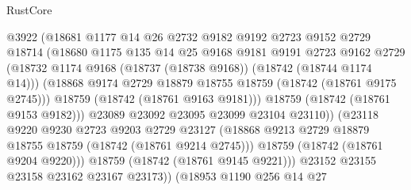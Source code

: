 \begin{lexlean}{RustCore}
\begin{coremodule}
                            @3922
                            (@18681
                              @1177
                              @14
                              @26
                              @2732
                              @9182
                              @9192
                              @2723
                              @9152
                              @2729
                              @18714
                              (@18680
                                @1175
                                @135
                                @14
                                @25
                                @9168
                                @9181
                                @9191
                                @2723
                                @9162
                                @2729
                                (@18732
                                  @1174
                                  @9168
                                  (@18737 (@18738 @9168))
                                  (@18742 (@18744 @1174 @14)))
                                (@18868
                                  @9174
                                  @2729
                                  @18879
                                  @18755
                                  @18759
                                  (@18742 (@18761 @9175 @2745)))
                                @18759
                                (@18742 (@18761 @9163 @9181)))
                              @18759
                              (@18742 (@18761 @9153 @9182)))
                            @23089
                            @23092
                            @23095
                            @23099
                            @23104
                            @23110))
                        (@23118
                          @9220
                          @9230
                          @2723
                          @9203
                          @2729
                          @23127
                          (@18868 @9213 @2729 @18879 @18755 @18759 (@18742 (@18761 @9214 @2745)))
                          @18759
                          (@18742 (@18761 @9204 @9220)))
                        @18759
                        (@18742 (@18761 @9145 @9221)))
                      @23152
                      @23155
                      @23158
                      @23162
                      @23167
                      @23173))
                  (@18953
                    @1190
                    @256
                    @14
                    @27

\end{coremodule}
\end{lexlean}
